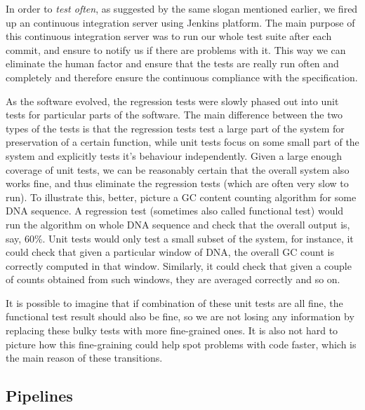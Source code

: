 In order to \emph{test often}, as suggested by the same slogan mentioned earlier, we fired up an continuous integration server using Jenkins platform. The main purpose of this continuous integration server was to run our whole test suite after each commit, and ensure to notify us if there are problems with it. 
This way we can eliminate the human factor and ensure that the tests are really run often and completely and therefore ensure the continuous compliance with the specification.

As the software evolved, the regression tests were slowly phased out into unit tests for particular parts of the software. The main difference between the two types of the tests is that the regression tests test a large part of the system for preservation of a certain function, while unit tests focus on some small part of the system and explicitly tests it's behaviour independently. Given a large enough coverage of unit tests, we can be reasonably certain that the overall system also works fine, and thus eliminate the regression tests (which are often very slow to run). To illustrate this, better, picture a GC content counting algorithm for some DNA sequence. 
A regression test (sometimes also called functional test) would run the algorithm on whole DNA sequence and check that the overall output is, say, 60\%. 
Unit tests would only test a small subset of the system, for instance, it could check that given a particular window of DNA, the overall GC count is correctly computed in that window. Similarly, it could check that given a couple of counts obtained from such windows, they are averaged correctly and so on. 

It is possible to imagine that if combination of these unit tests are all fine, the functional test result should also be fine, so we are not losing any information by replacing these bulky tests with more fine-grained ones. It is also not hard to picture how this fine-graining could help spot problems with code faster, which is the main reason of these transitions.


\subsection{Pipelines}
\label{sec:pipelines}

